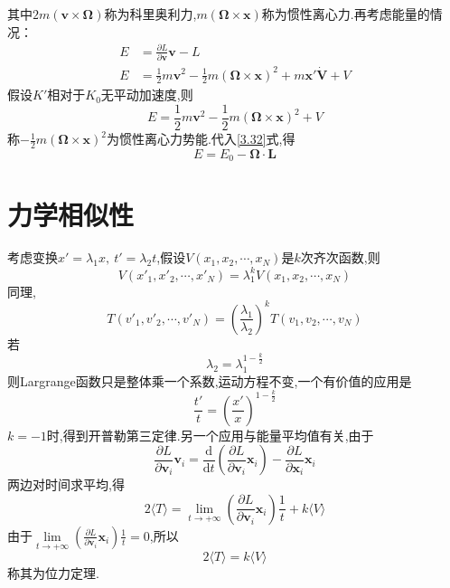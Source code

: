 其中$2m(\boldsymbol{v}\times\boldsymbol{\Omega})$称为科里奥利力,$m(\boldsymbol{\Omega}\times\boldsymbol{x})$称为惯性离心力.再考虑能量的情况：
\begin{align}
E & = \frac{\partial L}{\partial\boldsymbol{v}}\boldsymbol{v} - L\\
E & = \frac{1}{2}m\boldsymbol{v}^2 - \frac{1}{2}m(\boldsymbol{\Omega}\times\boldsymbol{x})^2 + m\boldsymbol{x}'\boldsymbol{\dot{V}} + V
\end{align}
假设$K'$相对于$K_0$无平动加速度,则
\begin{equation}
E = \frac{1}{2}m\boldsymbol{v}^2 - \frac{1}{2}m(\boldsymbol{\Omega}\times\boldsymbol{x})^2 + V
\end{equation}
称$-\frac{1}{2}m(\boldsymbol{\Omega}\times\boldsymbol{x})^2$为惯性离心力势能.代入\eqref{3.32}式,得
\begin{equation}
E = E_0 - \boldsymbol{\Omega}\cdot\boldsymbol{L}
\end{equation}

\section{力学相似性}
考虑变换$x'=\lambda_1 x,\ t'=\lambda_2 t$,假设$V(x_1,x_2,\cdots,x_N)$是$k$次齐次函数,则
\begin{equation}
V(x'_1,x'_2,\cdots,x'_N) = \lambda_1^k V(x_1,x_2,\cdots,x_N)
\end{equation}
同理,
\begin{equation}
T(v'_1,v'_2,\cdots,v'_N) = \left(\frac{\lambda_1}{\lambda_2}\right)^k 
T(v_1,v_2,\cdots,v_N)
\end{equation}
若
\begin{equation}
\lambda_2 = \lambda_1^{1-\frac{k}{2}}
\end{equation}
则Largrange函数只是整体乘一个系数,运动方程不变,一个有价值的应用是
\begin{equation}
\frac{t'}{t} = \left(\frac{x'}{x}\right)^{1-\frac{k}{2}}
\end{equation}
$k=-1$时,得到开普勒第三定律.另一个应用与能量平均值有关,由于 %
\begin{equation}
\frac{\partial L}{\partial \boldsymbol{v}_i}\boldsymbol{v}_i = \frac{\mathrm{d}}{\mathrm{d}t}
\left(
\frac{\partial L}{\partial \boldsymbol{v}_i}\boldsymbol{x}_i
\right)
- \frac{\partial L}{\partial \boldsymbol{x}_i}\boldsymbol{x}_i
\end{equation}
两边对时间求平均,得
\begin{equation}
2\langle T \rangle = \lim_{t \rightarrow +\infty} \left(\frac{\partial L}{\partial \boldsymbol{v}_i}\boldsymbol{x}_i\right)\frac{1}{t} + k\langle V \rangle
\end{equation}
由于$\lim\limits_{t \rightarrow +\infty} \left(\frac{\partial L}{\partial \boldsymbol{v}_i}\boldsymbol{x}_i\right)\frac{1}{t} = 0$,所以
\begin{equation}
2\langle T \rangle = k\langle V \rangle
\end{equation}
称其为位力定理.

